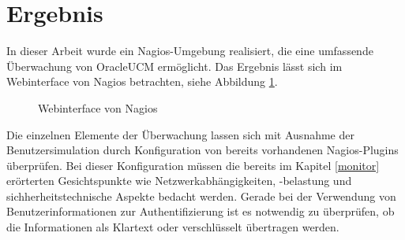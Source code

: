 \section{Ergebnis}

In dieser Arbeit wurde ein Nagios-Umgebung realisiert, die eine umfassende Überwachung von \gls{OracleUCM} ermöglicht.
Das Ergebnis lässt sich im Webinterface von Nagios betrachten, siehe Abbildung \ref{nweb}.



\begin{figure}[ht]
	\centering
		\caption{Webinterface von Nagios}
		\label{nweb}
\end{figure}

Die einzelnen Elemente der Überwachung lassen sich mit Ausnahme der Benutzersimulation durch Konfiguration von bereits vorhandenen Nagios-Plugins überprüfen.
Bei dieser Konfiguration müssen die bereits im Kapitel \ref{monitor} erörterten Gesichtspunkte wie Netzwerkabhängigkeiten, -belastung und sichherheitstechnische Aspekte bedacht werden.
Gerade bei der Verwendung von Benutzerinformationen zur Authentifizierung ist es notwendig zu überprüfen, ob die Informationen als Klartext oder verschlüsselt übertragen werden.\\

